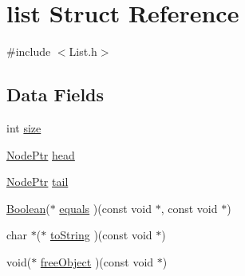 \hypertarget{structlist}{\section{list Struct Reference}
\label{structlist}
}


{\ttfamily \#include $<$List.\-h$>$}

\subsection*{Data Fields}
\begin{DoxyCompactItemize}
\item 
int \hyperlink{structlist_a3b03adad0c0429bae9493667ff366dc2}{size}
\item 
\hyperlink{include_2Node_8h_aa6eec21621b8638e350fd0ec238a9715}{Node\-Ptr} \hyperlink{structlist_a357a56cbe66297fb5cc5cd8ba9fa6cf4}{head}
\item 
\hyperlink{include_2Node_8h_aa6eec21621b8638e350fd0ec238a9715}{Node\-Ptr} \hyperlink{structlist_a7fba27040dab68e2d6acc2885b6df167}{tail}
\item 
\hyperlink{include_2common_8h_a127a96e09108f503cca20256eaa4ddff}{Boolean}($\ast$ \hyperlink{structlist_a5855acf2ffa2b92d9cb0cecb48c06fb3}{equals} )(const void $\ast$, const void $\ast$)
\item 
char $\ast$($\ast$ \hyperlink{structlist_a42d6b0844dfb82a44cbeaab4f7ec0877}{to\-String} )(const void $\ast$)
\item 
void($\ast$ \hyperlink{structlist_a04091cb910e425d1226562197fe0bf8c}{free\-Object} )(const void $\ast$)
\end{DoxyCompactItemize}


